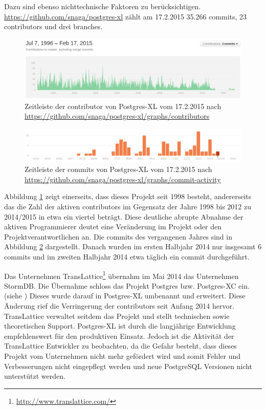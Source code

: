 Dazu sind ebenso nichttechnische Faktoren zu berücksichtigen.\\
\url{https://github.com/snaga/postgres-xl} zählt am 17.2.2015 35.266 commits, 23 contributors und drei branches.
\begin{figure}[h!]
\centering
\includegraphics[width=\textwidth]{Abbildungen/postgresxl_timeline_contributors.png}
\caption[Zeitleiste der contributor von Postgres-XL]{Zeitleiste der contributor von Postgres-XL vom 17.2.2015 nach \url{https://github.com/snaga/postgres-xl/graphs/contributors}}
\label{fig:timeline_contr_postgresxl}
\end{figure}
\begin{figure}[h!]
\centering
\includegraphics[width=\textwidth]{Abbildungen/postgresxl_timeline_commits.png}
\caption[Zeitleiste der commits von Postgres-XL]{Zeitleiste der commits von Postgres-XL vom 17.2.2015 nach \url{https://github.com/snaga/postgres-xl/graphs/commit-activity}}
\label{fig:timeline_commits_postgresxl}
\end{figure}
Abbildung \ref{fig:timeline_contr_postgresxl} zeigt einerseits, dass dieses Projekt seit 1998 besteht, andererseits das die Zahl der aktiven contributors im Gegensatz der Jahre 1998 bis 2012 zu 2014/2015 in etwa ein viertel beträgt.
Diese deutliche abrupte Abnahme der aktiven Programmierer deutet eine Veränderung im Projekt oder den Projektverantwortlichen an.
Die commits des vergangenen Jahres sind in Abbildung \ref{fig:timeline_commits_postgresxl} dargestellt.
Danach wurden im ersten Halbjahr 2014 nur insgesamt 6 commits und im zweiten Halbjahr 2014 etwa täglich ein commit durchgeführt.

Das Unternehmen TransLattice\footnote{\url{http://www.translattice.com/}} übernahm im Mai 2014 das Unternehmen StormDB.
Die Übernahme schloss das Projekt Postgres bzw. Postgres-XC ein. (siehe \cite{website:translattice-stormdb})
Dieses wurde darauf in Postgres-XL umbenannt und erweitert.
Diese Änderung rief die Verringerung der contributors seit Anfang 2014 hervor.
TransLattice verwaltet seitdem das Projekt und stellt technischen sowie theoretischen Support.
Postgres-XL ist durch die langjährige Entwicklung empfehlenswert für den produktiven Einsatz.
Jedoch ist die Aktivität der TransLattice Entwickler zu beobachten, da die Gefahr besteht, dass dieses Projekt vom Unternehmen nicht mehr gefördert wird und somit Fehler und Verbesserungen nicht eingepflegt werden und neue PostgreSQL Versionen nicht unterstützt werden.


